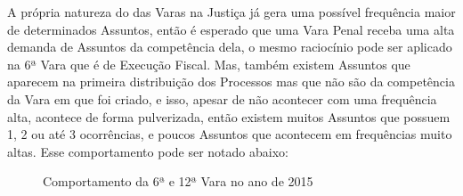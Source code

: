 A própria natureza do das Varas na Justiça já gera uma possível frequência maior de determinados Assuntos, então é esperado que uma Vara Penal receba uma alta demanda de Assuntos da competência dela, o mesmo raciocínio pode ser aplicado na 6ª Vara que é de Execução Fiscal. Mas, também existem Assuntos que aparecem na primeira distribuição dos Processos mas que não são da competência da Vara em que foi criado, e isso, apesar de não acontecer com uma frequência alta, acontece de forma pulverizada, então existem muitos Assuntos que possuem 1, 2 ou até 3 ocorrências, e poucos Assuntos que acontecem em frequências muito altas. Esse comportamento pode ser notado abaixo:
\pagebreak
\begin{figure}[h]
	\centering
	\qquad
	\caption{Comportamento da 6ª e 12ª Vara no ano de 2015}%
\end{figure}

